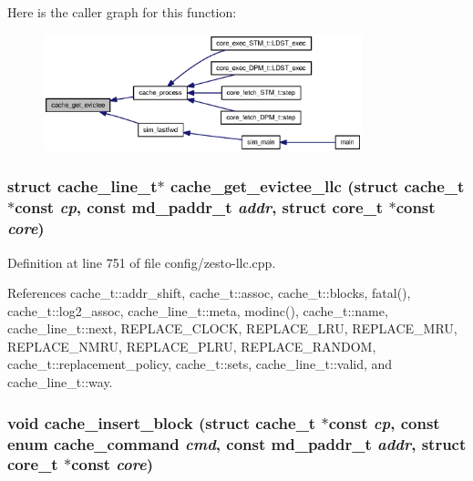 Here is the caller graph for this function:\nopagebreak
\begin{figure}[H]
\begin{center}
\leavevmode
\includegraphics[width=262pt]{zesto-cache_8h_ff8ad962ac5134671915f22e604a2f4e_icgraph}
\end{center}
\end{figure}
\subsubsection[{cache\_\-get\_\-evictee\_\-llc}]{\setlength{\rightskip}{0pt plus 5cm}struct {\bf cache\_\-line\_\-t}$\ast$ cache\_\-get\_\-evictee\_\-llc (struct {\bf cache\_\-t} $\ast$const  {\em cp}, \/  const {\bf md\_\-paddr\_\-t} {\em addr}, \/  struct {\bf core\_\-t} $\ast$const  {\em core})\hspace{0.3cm}{\tt  [read]}}\label{zesto-cache_8h_77864b4219a45ec15cbe3ff986d131b9}




Definition at line 751 of file config/zesto-llc.cpp.

References cache\_\-t::addr\_\-shift, cache\_\-t::assoc, cache\_\-t::blocks, fatal(), cache\_\-t::log2\_\-assoc, cache\_\-line\_\-t::meta, modinc(), cache\_\-t::name, cache\_\-line\_\-t::next, REPLACE\_\-CLOCK, REPLACE\_\-LRU, REPLACE\_\-MRU, REPLACE\_\-NMRU, REPLACE\_\-PLRU, REPLACE\_\-RANDOM, cache\_\-t::replacement\_\-policy, cache\_\-t::sets, cache\_\-line\_\-t::valid, and cache\_\-line\_\-t::way.
\subsubsection[{cache\_\-insert\_\-block}]{\setlength{\rightskip}{0pt plus 5cm}void cache\_\-insert\_\-block (struct {\bf cache\_\-t} $\ast$const  {\em cp}, \/  const enum {\bf cache\_\-command} {\em cmd}, \/  const {\bf md\_\-paddr\_\-t} {\em addr}, \/  struct {\bf core\_\-t} $\ast$const  {\em core})}\label{zesto-cache_8h_219ea5df10c94dbf2c820586f981158f}




